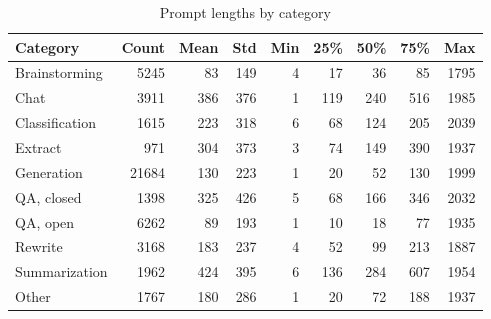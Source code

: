 \begin{table}[tp!]
    \centering
    \caption{Prompt lengths by category}
    \label{tab:prompt-lengths-by-tag}    \begin{tabular}{lrrrrrrrr}
    \toprule
    Category       &       Count & Mean &  Std & Min &  25\% &  50\% &  75\% &   Max \\
    \midrule
    Brainstorming  &        5245 &   83 &  149 &   4 &   17 &   36 &   85 &  1795 \\
    Chat           &        3911 &  386 &  376 &   1 &  119 &  240 &  516 &  1985 \\
    Classification &        1615 &  223 &  318 &   6 &   68 &  124 &  205 &  2039 \\
    Extract        &         971 &  304 &  373 &   3 &   74 &  149 &  390 &  1937 \\
    Generation     &       21684 &  130 &  223 &   1 &   20 &   52 &  130 &  1999 \\
    QA, closed     &        1398 &  325 &  426 &   5 &   68 &  166 &  346 &  2032 \\
    QA, open       &        6262 &   89 &  193 &   1 &   10 &   18 &   77 &  1935 \\
    Rewrite        &        3168 &  183 &  237 &   4 &   52 &   99 &  213 &  1887 \\
    Summarization  &        1962 &  424 &  395 &   6 &  136 &  284 &  607 &  1954 \\
    Other          &        1767 &  180 &  286 &   1 &   20 &   72 &  188 &  1937 \\
    \bottomrule
    \end{tabular}
\end{table}

